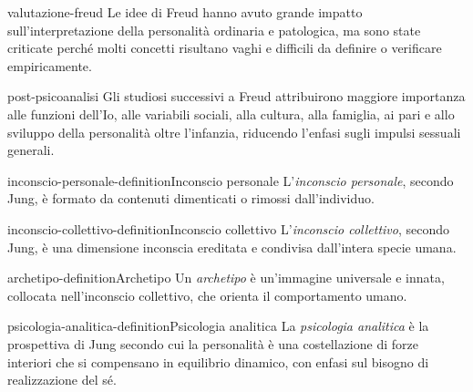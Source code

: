 \documentclass[preview]{standalone}
\begin{document}
\begin{snippet}{valutazione-freud}
    Le idee di Freud hanno avuto grande impatto sull'interpretazione della
    personalità ordinaria e patologica, ma sono state criticate perché molti
    concetti risultano vaghi e difficili da definire o verificare empiricamente.
\end{snippet}

\begin{snippet}{post-psicoanalisi}
    Gli studiosi successivi a Freud attribuirono maggiore importanza alle
    funzioni dell'Io, alle variabili sociali, alla cultura, alla famiglia, ai
    pari e allo sviluppo della personalità oltre l'infanzia, riducendo
    l'enfasi sugli impulsi sessuali generali.
\end{snippet}

\begin{snippetdefinition}{inconscio-personale-definition}{Inconscio personale}
    L'\emph{inconscio personale}, secondo Jung, è formato da contenuti
    dimenticati o rimossi dall'individuo.
\end{snippetdefinition}

\begin{snippetdefinition}{inconscio-collettivo-definition}{Inconscio collettivo}
    L'\emph{inconscio collettivo}, secondo Jung, è una dimensione inconscia
    ereditata e condivisa dall'intera specie umana.
\end{snippetdefinition}

\begin{snippetdefinition}{archetipo-definition}{Archetipo}
    Un \emph{archetipo} è un'immagine universale e innata, collocata
    nell'inconscio collettivo, che orienta il comportamento umano.
\end{snippetdefinition}

\begin{snippetdefinition}{psicologia-analitica-definition}{Psicologia analitica}
    La \emph{psicologia analitica} è la prospettiva di Jung secondo cui la
    personalità è una costellazione di forze interiori che si compensano in
    equilibrio dinamico, con enfasi sul bisogno di realizzazione del sé.
\end{snippetdefinition}
\end{document}
